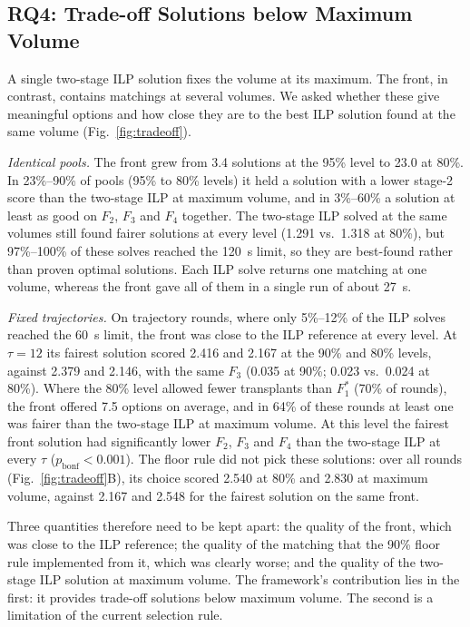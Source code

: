 \documentclass[journal]{IEEEtran}
\begin{document}
\subsection{RQ4: Trade-off Solutions below Maximum Volume}
\label{sec:results:rq4}

A single two-stage ILP solution fixes the volume at its maximum. The
front, in contrast, contains matchings at several volumes. We asked
whether these give meaningful options and how close they are to the best
ILP solution found at the same volume (Fig.~\ref{fig:tradeoff}).

\emph{Identical pools.} The front grew from 3.4 solutions at the 95\% level
to 23.0 at 80\%. In 23\%--90\% of pools (95\% to 80\% levels) it held a
solution with a lower stage-2 score than the two-stage ILP at maximum
volume, and in 3\%--60\% a solution at least as good on $F_2$, $F_3$ and
$F_4$ together. The two-stage ILP solved at the same volumes still found
fairer solutions at every level (1.291 vs.\ 1.318 at 80\%), but
97\%--100\% of these solves reached the 120~s limit, so they are
best-found rather than proven optimal solutions. Each ILP solve returns
one matching at one volume, whereas the front gave all of them in a
single run of about 27~s.

\emph{Fixed trajectories.} On trajectory rounds, where only 5\%--12\% of
the ILP solves reached the 60~s limit, the front was close to the ILP
reference at every level. At $\tau = 12$ its fairest solution scored
2.416 and 2.167 at the 90\% and 80\% levels, against 2.379 and 2.146, with
the same $F_3$ (0.035 at 90\%; 0.023 vs.\ 0.024 at 80\%). Where the 80\%
level allowed fewer transplants than $F_1^*$ (70\% of rounds), the front
offered 7.5 options on average, and in 64\% of these rounds at least one
was fairer than the two-stage ILP at maximum volume. At this level the
fairest front solution had significantly lower $F_2$, $F_3$ and $F_4$ than
the two-stage ILP at every $\tau$ ($p_{\mathrm{bonf}} < 0.001$). The floor rule did not pick these solutions: over all rounds (Fig.~\ref{fig:tradeoff}B), its choice scored 2.540 at 80\% and
2.830 at maximum volume, against 2.167 and 2.548 for the fairest solution
on the same front.

Three quantities therefore need to be kept apart: the quality of the
front, which was close to the ILP reference; the quality of the matching
that the 90\% floor rule implemented from it, which was clearly worse; and
the quality of the two-stage ILP solution at maximum volume. The
framework's contribution lies in the first: it provides trade-off
solutions below maximum volume. The second is a limitation of the current
selection rule.
\end{document}

